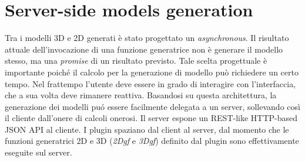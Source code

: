 \section{Server-side models generation}
\label{sec:chapter_3_section_5}

\noindent
Tra i modelli 3D e 2D generati è stato progettato un \emph{asynchronous}.
Il risultato attuale dell'invocazione di una funzione generatrice non \`e generare il modello stesso,
ma una \emph{promise} di un risultato previsto. Tale scelta progettuale \`e importante poich\'e il calcolo per la
generazione di modello pu\`o richiedere un certo tempo.
Nel frattempo l'utente deve essere in grado di interagire con l'interfaccia, che a sua volta deve rimanere reattiva.
Basandosi su questa architettura, la generazione dei modelli pu\'o essere facilmente delegata a un server,
sollevando così il cliente dall'onere di calcoli onerosi. Il server espone un REST-like HTTP-based JSON API al cliente.
I plugin spaziano dal client al server, dal momento che le funzioni generatrici 2D e 3D (\emph{2Dgf} e \emph{3Dgf})
 definito dal plugin sono effettivamente eseguite sul server.



